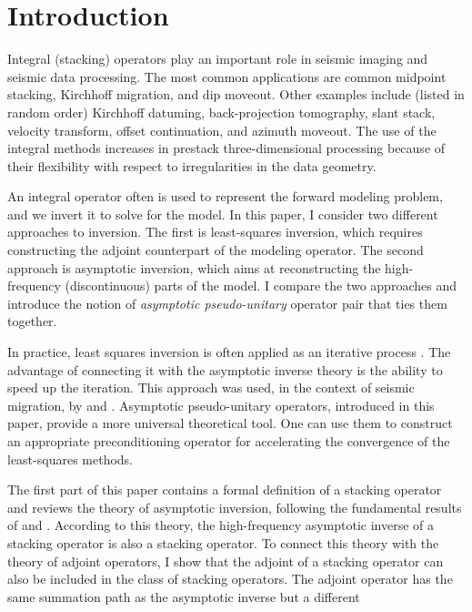 \section{Introduction}

Integral (stacking) operators play an important role in seismic
imaging and seismic data processing. The most common applications are
common midpoint stacking, Kirchhoff migration, and dip moveout.  Other
examples include (listed in random order) Kirchhoff datuming,
back-projection tomography, slant stack, velocity transform, offset
continuation, and azimuth moveout. The use of the integral methods
increases in prestack three-dimensional processing because of their
flexibility with respect to irregularities in the data geometry.
\par
An integral operator often is used to represent the forward modeling
problem, and we invert it to solve for the model. In this paper, I
consider two different approaches to inversion. The first is
least-squares inversion, which requires constructing the adjoint
counterpart of the modeling operator.  The second approach is
asymptotic inversion, which aims at reconstructing the high-frequency
(discontinuous) parts of the model. I compare the two approaches and
introduce the notion of \emph{asymptotic pseudo-unitary} operator pair 
that ties them together.
\par
In practice, least squares inversion is often applied as an iterative
process \cite[]{GEO65-05-13641371}. The advantage of connecting it with
the asymptotic inverse theory is the ability to speed up the
iteration. This approach was used, in the context of seismic
migration, by \cite{jin} and \cite{lambare}.  Asymptotic
pseudo-unitary operators, introduced in this paper, provide a more
universal theoretical tool. One can use them to construct an
appropriate preconditioning operator for accelerating the convergence
of the least-squares methods.
\par
The first part of this paper contains a formal definition of a
stacking operator and reviews the theory of asymptotic inversion,
following the fundamental results of \cite{beylkin} and
\cite{goldin,Goldin.sep.67.171}.  According to this theory, the
high-frequency asymptotic inverse of a stacking operator is also a
stacking operator. To connect this theory with the theory of adjoint
operators, I show that the adjoint of a stacking operator can also be
included in the class of stacking operators.  The adjoint operator has
the same summation path as the asymptotic inverse but a different
